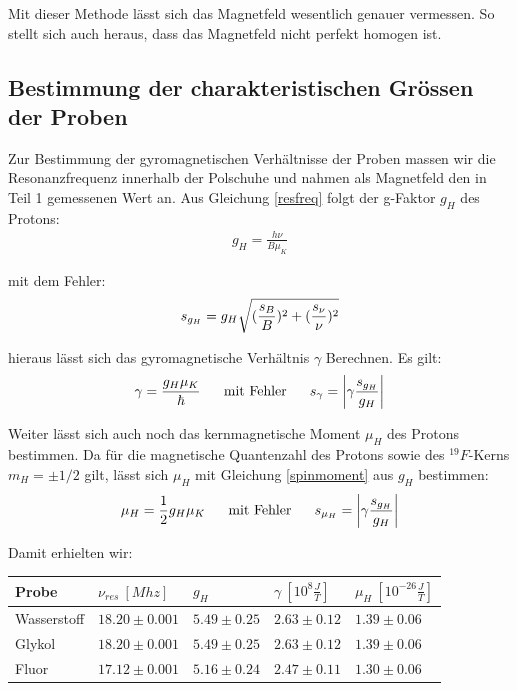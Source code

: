 \documentclass[12pt]{article}
\begin{document}
Mit dieser Methode lässt sich das Magnetfeld wesentlich genauer vermessen. So stellt sich auch heraus, dass das Magnetfeld nicht perfekt homogen ist.

\subsection{Bestimmung der charakteristischen Grössen der Proben}

Zur Bestimmung der gyromagnetischen Verhältnisse der Proben massen wir die Resonanzfrequenz innerhalb der Polschuhe und nahmen als Magnetfeld den in Teil 1 gemessenen Wert an. Aus Gleichung \ref{resfreq} folgt der g-Faktor $g_H$ des Protons:
\begin{align}
 g_H = \frac{h\nu}{B \mu_K}
\end{align}

mit dem Fehler:
\begin{align}
 \notag s_{g_H} = g_H \sqrt{(\frac{s_B}{B})^2+(\frac{s_{\nu}}{\nu})^2}
\end{align}

hieraus lässt sich das gyromagnetische Verhältnis $\gamma$ Berechnen. Es gilt:
\begin{align}
 \gamma = \frac{g_H \mu_K}{\hbar}~~~~~\textnormal{mit Fehler}~~~~~s_{\gamma} = \left| \gamma \frac{s_{g_H}}{g_H} \right|
\end{align}

Weiter lässt sich auch noch das kernmagnetische Moment $\mu_H$ des Protons bestimmen. Da für die magnetische Quantenzahl des Protons sowie des $^{19}F$-Kerns $m_H = \pm1/2$ gilt, lässt sich $\mu_H$ mit Gleichung \ref{spinmoment} aus $g_H$ bestimmen:
\begin{align}
 \mu_H = \frac{1}{2} g_H \mu_K~~~~~\textnormal{mit Fehler}~~~~~s_{\mu_H}= \left| \gamma \frac{s_{g_H}}{g_H} \right|
\end{align}

Damit erhielten wir:
\begin{center}
\begin{tabular}{|l|llll|}
\hline
Probe & $\nu_{res}~[Mhz]$ & $g_H$ & $\gamma~[10^8\frac{J}{T}]$ & $\mu_H~[10^{-26}\frac{J}{T}]$ \\ 
\hline
Wasserstoff & $18.20\pm0.001$ & $5.49\pm0.25$ & $2.63\pm0.12$ & $1.39\pm0.06$ \\ 
Glykol & $18.20\pm0.001$ & $5.49\pm0.25$ & $2.63\pm0.12$ & $1.39\pm0.06$ \\ 
Fluor & $17.12\pm0.001$ & $5.16\pm0.24$ & $2.47\pm0.11$ & $1.30\pm0.06$ \\
\hline
\end{tabular}
\end{center}
\end{document}
